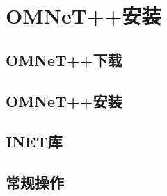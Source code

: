 \chapter{OMNeT++安装}

\begin{summary}
  \blindtext
\end{summary}

\section{OMNeT++下载}
\Blindtext

\section{OMNeT++安装}
\Blindtext

\section{INET库}
\Blindtext

\section{常规操作}
\Blindtext


